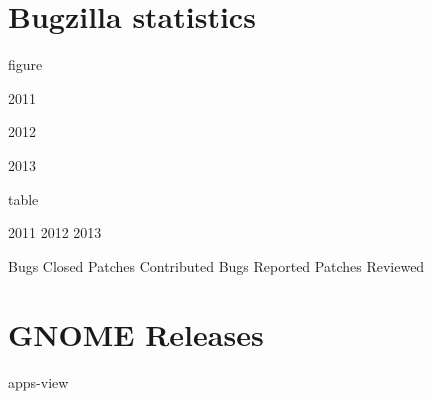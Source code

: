 \documentclass{scrreprt}
\begin{document}
\section{Bugzilla statistics}

figure

2011

2012

2013


table

2011   2012  2013




Bugs Closed         Patches Contributed     Bugs Reported       Patches Reviewed



\section{GNOME Releases}
apps-view
\end{document}
